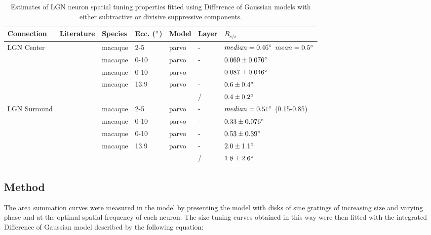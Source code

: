 \begin{table}
  \centering
  \begin{adjustbox}{width=1\textwidth}
  \begin{tabular}{l | l l l l l l}
    Connection   & Literature            & Species  & Ecc. ($\degree$) & Model & Layer & $R_{c/s}$ \\
    \hline
    LGN Center   & \cite{Sceniak2006}    & macaque  & 2-5  & parvo & - & $median = 0.46 \degree$ $mean = 0.5 \degree$ \\
                 & \cite{Levitt2001}     & macaque  & 0-10 & parvo & - & $0.069 \pm 0.076 \degree$ \\
                 & \cite{Spear1994}      & macaque  & 0-10 & parvo & - & $0.087 \pm 0.046 \degree$ \\
                 & \cite{Bonin2005}      & macaque  & 13.9 & parvo & - & $0.6 \pm 0.4 \degree$\\
                 &                       &          &      &       & / & $0.4 \pm 0.2 \degree$ \\
    \hline
    LGN Surround & \cite{Sceniak2006}    & macaque  & 2-5  & parvo & - &$median = 0.51 \degree$ (0.15-0.85) \\
                 & \cite{Levitt2001}     & macaque  & 0-10 & parvo & - & $0.33 \pm 0.076 \degree$ \\
                 & \cite{Spear1994}      & macaque  & 0-10 & parvo & - & $0.53 \pm 0.39 \degree$ \\
                 & \cite{Bonin2005}      & macaque  & 13.9 & parvo & - & $2.0 \pm 1.1 \degree$\\
                 &                       &          &      &       & / & $1.8 \pm 2.6 \degree$\\

    \hline
  \end{tabular}
  \end{adjustbox}
  \caption{Estimates of LGN neuron spatial tuning properties fitted using Difference of Gaussian models
           with either subtractive or divisive suppressive components.}
  \label{LGNEstimates}
\end{table}

\subsection{Method}

The area summation curves were measured in the model by presenting the
model with disks of sine gratings of increasing size and varying phase
and at the optimal spatial frequency of each neuron. The size tuning
curves obtained in this way were then fitted with the integrated
Difference of Gaussian model described by the following equation:

